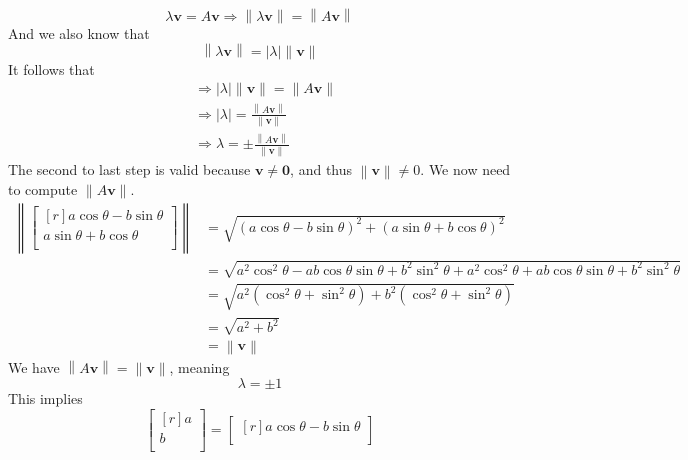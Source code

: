 \documentclass[12pt, letterpaper]{article}
\begin{document}
\begin{solution}
    \[
        \lambda \mathbf{v} = A\mathbf{v} \Longrightarrow \left\lVert \lambda \mathbf{v} \right\rVert = \left\lVert A\mathbf{v} \right\rVert
    \]
    And we also know that
    \[
        \left\lVert \lambda \mathbf{v} \right\rVert =\vert \lambda  \vert \lVert \mathbf{v} \rVert 
    \]
    It follows that
    \begin{align*}
        &\Longrightarrow \vert \lambda  \vert \lVert \mathbf{v} \rVert = \lVert A \mathbf{v} \rVert \\
        &\Longrightarrow \vert \lambda  \vert = \frac{\left\lVert A \mathbf{v} \right\rVert }{\lVert \mathbf{v} \rVert}\\
        &\Longrightarrow \lambda =\pm \frac{\left\lVert A \mathbf{v} \right\rVert }{\lVert \mathbf{v} \rVert }
    \end{align*}
    The second to last step is valid because \(\mathbf{v}\neq \mathbf{0}\), and thus \(\left\lVert \mathbf{v} \right\rVert\neq 0 \). We now need to compute \(\lVert A \mathbf{v} \rVert \). 
    \begin{align*}
        \left\lVert \begin{bmatrix}[r]
            a \cos \theta -b\sin \theta  \\
             a \sin \theta +b\cos \theta \\
       \end{bmatrix} \right\rVert &=\sqrt{\left( a \cos \theta -b\sin \theta  \right)^2 +\left( a \sin \theta +b\cos \theta  \right)^2  }\\
       &=\sqrt{a^2 \cos ^2\theta -ab\cos \theta \sin \theta +b^2 \sin ^2\theta +a^2 \cos ^2\theta +ab\cos \theta \sin \theta +b^2 \sin ^2\theta } \\
       &=\sqrt{a^2 \left( \cos ^2 \theta +\sin ^2\theta  \right) +b^2 \left( \cos ^2 \theta +\sin ^2\theta  \right) }\\
       &=\sqrt{a^2 +b^2}\\
       &=\left\lVert \mathbf{v} \right\rVert  
    \end{align*}
    We have \(\left\lVert A\mathbf{v} \right\rVert =\lVert \mathbf{v} \rVert  \), meaning
    \[
        \lambda =\pm 1
    \]
    This implies
    \[
        \begin{bmatrix}[r]
             a \\
             b \\
        \end{bmatrix} = \begin{bmatrix}[r]
            a \cos \theta -b\sin \theta  \\

\end{bmatrix}\]
\end{solution}
\end{document}
